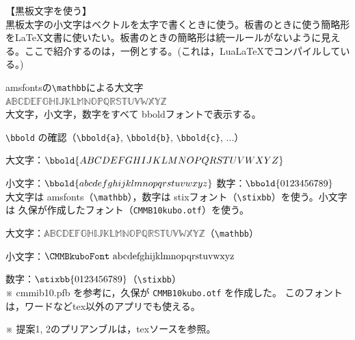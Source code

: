 \documentclass{ltjsarticle}
\DeclareRobustCommand{\kubold}[1]{\text{\CMMBkuboFont #1}}
\begin{document}
\Large\noindent
{\huge 【黒板文字を使う】}\\
黒板太字の小文字はベクトルを太字で書くときに使う。板書のときに使う簡略形を{\LaTeX}文書に使いたい。板書のときの簡略形は統一ルールがないように見える。ここで紹介するのは，一例とする。(これは，Lua\LaTeX でコンパイルしている。)

amsfontsの\verb|\mathbb|による大文字\\
$\mathbb{ABCDEFGHIJKLMNOPQRSTUVWXYZ}$\\

大文字，小文字，数字をすべて bboldフォントで表示する。\par

\verb|\bbold| の確認（\verb|\bbold{a}|, \verb|\bbold{b}|, \verb|\bbold{c}|, ...）\par
大文字：$\bbold{ABCDEFGHIJKLMNOPQRSTUVWXYZ}$\par
小文字：$\bbold{abcdefghijklmnopqrstuvwxyz}$\qquad
数字：$\bbold{0123456789}$\\


大文字は amsfonts（\verb|\mathbb|），数字は stixフォント（\verb|\stixbb|）を使う。小文字は 久保が作成したフォント（\verb|CMMB10kubo.otf|）を使う。\par
大文字：$\mathbb{ABCDEFGHIJKLMNOPQRSTUVWXYZ}$（\verb|\mathbb|）\par
小文字：$\kubold{abcdefghijklmnopqrstuvwxyz}$\par
数字：$\stixbb{0123456789}$（\verb|\stixbb|）\\
※ cmmib10.pfb を参考に，久保が \verb|CMMB10kubo.otf| を作成した。
このフォントは，ワードなどtex以外のアプリでも使える。



\vspace{\baselineskip}

※ 提案1, 2のプリアンブルは，texソースを参照。\par
\end{document}
